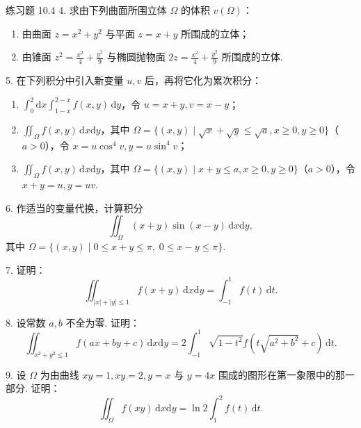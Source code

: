 \begin{exblock}{练习题 10.4}
4. 求由下列曲面所围立体 $\Omega$ 的体积 $v(\Omega)$：
\begin{enumerate}
  \item 由曲面 $z = x^2+y^2$ 与平面 $z = x+y$ 所围成的立体；
  \item 由锥面 $z^2 = \frac{x^2}{4}+\frac{y^2}{9}$ 与椭圆抛物面 $2z = \frac{x^2}{4}+\frac{y^2}{9}$ 所围成的立体.
\end{enumerate}

5. 在下列积分中引入新变量 $u, v$ 后，再将它化为累次积分：
\begin{enumerate}
  \item $\displaystyle \int_0^2 \mathrm{d}x \int_{1-x}^{2-x} f(x, y)\,\mathrm{d}y$，令 $u = x+y, v = x-y$；
  \item $\displaystyle \iint_\Omega f(x, y)\,\mathrm{d}x\mathrm{d}y$，其中 $\Omega = \{(x, y) \mid \sqrt{x}+\sqrt{y} \leqslant \sqrt{a}, x \geqslant 0, y \geqslant 0\}$（$a > 0$），令 $x = u\cos^4 v, y = u\sin^4 v$；
  \item $\displaystyle \iint_\Omega f(x, y)\,\mathrm{d}x\mathrm{d}y$，其中 $\Omega = \{(x, y) \mid x+y \leqslant a, x \geqslant 0, y \geqslant 0\}$（$a > 0$），令 $x+y=u, y=uv$.
\end{enumerate}

6. 作适当的变量代换，计算积分
\[
\iint_\Omega (x+y)\sin(x-y)\,\mathrm{d}x\mathrm{d}y,
\]
其中 $\Omega = \{(x, y) \mid 0 \leqslant x+y \leqslant \pi,\; 0 \leqslant x-y \leqslant \pi\}$.

7. 证明：
\[
\iint_{|x|+|y| \leqslant 1} f(x+y)\,\mathrm{d}x\mathrm{d}y = \int_{-1}^1 f(t)\,\mathrm{d}t.
\]

8. 设常数 $a, b$ 不全为零. 证明：
\[
\iint_{x^2+y^2 \leqslant 1} f(ax+by+c)\,\mathrm{d}x\mathrm{d}y = 2 \int_{-1}^1 \sqrt{1-t^2} f(t\sqrt{a^2+b^2}+c)\,\mathrm{d}t.
\]

9. 设 $\Omega$ 为由曲线 $xy=1, xy=2, y=x$ 与 $y=4x$ 围成的图形在第一象限中的那一部分. 证明：
\[
\iint_\Omega f(xy)\,\mathrm{d}x\mathrm{d}y = \ln 2 \int_1^2 f(t)\,\mathrm{d}t.
\]
\end{exblock}

